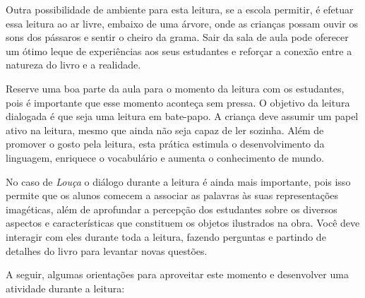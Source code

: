 \documentclass[11pt]{extarticle}
\begin{document}

Outra possibilidade de ambiente para esta leitura, se a escola permitir, 
é efetuar essa leitura ao ar livre, embaixo de uma árvore, onde as crianças 
possam ouvir os sons dos pássaros e sentir o cheiro da grama. Sair da sala 
de aula pode oferecer um ótimo leque de experiências aos seus estudantes e 
reforçar a conexão entre a natureza do livro e a realidade.  

Reserve uma boa parte da aula para o momento da leitura com os estudantes, 
pois é importante que esse momento aconteça sem pressa. O objetivo da 
leitura dialogada é que seja uma leitura em bate-papo. A criança deve 
assumir um papel ativo na leitura, mesmo que ainda não seja capaz de 
ler sozinha. Além de promover o gosto pela leitura, esta prática estimula 
o desenvolvimento da linguagem, enriquece o vocabulário e 
aumenta o conhecimento de mundo.

No caso de \textit{Louça} o diálogo durante a leitura é 
ainda mais importante, pois isso permite que os alunos comecem a associar as palavras às suas representações imagéticas, além de aprofundar a percepção dos estudantes sobre os diversos aspectos e características que constituem os objetos ilustrados na obra.
Você deve interagir com eles durante toda a 
leitura, fazendo perguntas e partindo de detalhes do livro para 
levantar novas questões. 

A seguir, algumas orientações para aproveitar este momento e desenvolver uma atividade durante a leitura: 
\end{document}
